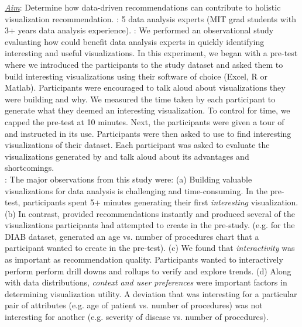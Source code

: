 

{\it \underline{Aim}}: Determine how data-driven 
recommendations can contribute to holistic visualization recommendation.
: 5 data analysis experts (MIT grad students with 3+ years data analysis experience).
: We performed an observational study evaluating how \SeeDB could benefit data analysis experts in quickly identifying interesting and useful visualizations.
In this experiment, we began with a pre-test where we introduced the participants to the study dataset and asked them to build interesting visualizations using their software of choice (Excel, R or Matlab).
Participants were encouraged to talk aloud about visualizations they were building and why.
We measured the time taken by each participant to generate what they deemed an interesting visualization.
To control for time, we capped the pre-test at 10 minutes.
Next, the participants were given a tour of \SeeDB and instructed in its use.
Participants were then asked to use \SeeDB to find interesting visualizations of their dataset.
Each participant was asked to evaluate the visualizations generated by \SeeDB and talk aloud about its advantages and shortcomings.\\
:
The major observations from this study were:
 (a) Building valuable visualizations for data analysis is challenging and time-consuming. In the pre-test, participants spent 5+ minutes generating their first {\it interesting} visualization.
(b) In contrast, \SeeDB provided recommendations instantly and produced several of the visualizations participants had attempted to create in the pre-study.  
(e.g. for the DIAB dataset, \SeeDB generated an age vs. number of procedures chart that a participant wanted to create in the pre-test).
(c) We found that {\it interactivity} was as important as recommendation quality. Participants wanted to interactively perform perform drill downs and rollups to verify and explore trends.
 (d) Along with data distributions, {\it context and user preferences}  were  important factors in determining visualization utility. A deviation that was interesting for a particular pair of attributes (e.g. age of patient vs. number of procedures) was not interesting for another (e.g. severity of disease vs. number of procedures). 

